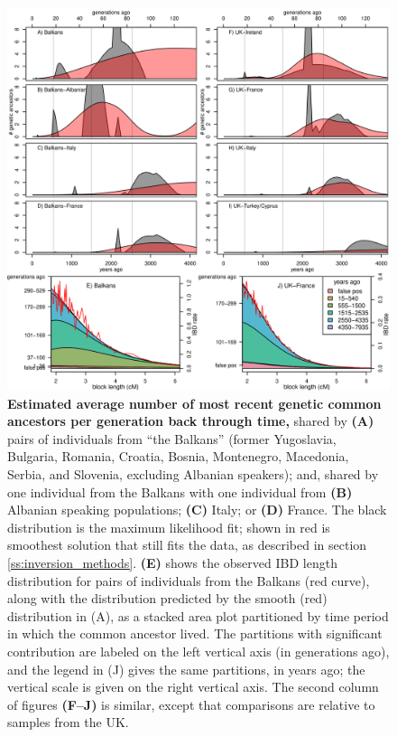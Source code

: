 \documentclass{article}
\begin{document}
\begin{figure}[!htp]
  \begin{center}
    \includegraphics{inversion-distributions}
    \caption{
    {\bf Estimated average number of most recent genetic common ancestors per generation back through time,}
    shared by {\bf (A)} pairs of individuals from ``the Balkans'' (former Yugoslavia, Bulgaria, Romania, Croatia, Bosnia, Montenegro, Macedonia, Serbia, and Slovenia,
    excluding Albanian speakers);
    and, shared by one individual from the Balkans with one individual from 
    {\bf (B)} Albanian speaking populations;
    {\bf (C)} Italy;
    or {\bf (D)} France.
    The black distribution is the maximum likelihood fit;
    shown in red is smoothest solution that still fits the data,
    as described in section \ref{ss:inversion_methods}.
    {\bf (E)} shows the observed IBD length distribution for pairs of individuals from the Balkans (red curve),
    along with the distribution predicted by the smooth (red) distribution in {(A)},
    as a stacked area plot partitioned by time period in which the common ancestor lived.
    The partitions with significant contribution are labeled on the left vertical axis (in generations ago), 
    and the legend in {(J)} gives the same partitions, in years ago; 
    the vertical scale is given on the right vertical axis.
    The second column of figures {\bf (F--J)} is similar,
    except that comparisons are relative to samples from the UK.
    \label{fig:inversion_distributions}
    }
  \end{center}
\end{figure}
\end{document}
